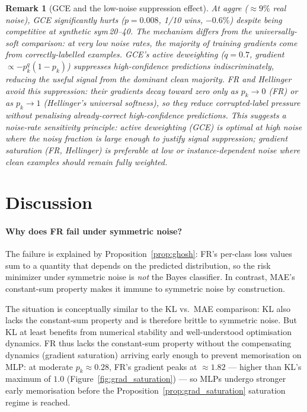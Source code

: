 \documentclass[11pt]{article}
\newtheorem{remark}{Remark}
\begin{document}
\begin{remark}[GCE and the low-noise suppression effect]
At aggre ($\approx 9\%$ real noise), GCE \emph{significantly hurts} ($p=0.008$, 1/10 wins, $-0.6\%$)
despite being competitive at synthetic sym\,20--40.
The mechanism differs from the universally-soft comparison: at very low noise rates,
the majority of training gradients come from correctly-labelled examples.
GCE's active deweighting ($q=0.7$, gradient $\propto -p_k^q(1-p_k)$)
suppresses high-confidence predictions indiscriminately, reducing the useful signal
from the dominant clean majority.
FR and Hellinger avoid this suppression: their gradients decay toward zero only as
$p_k\to 0$ (FR) or as $p_k\to 1$ (Hellinger's universal softness), so they
reduce corrupted-label pressure without penalising already-correct high-confidence predictions.
This suggests a \emph{noise-rate sensitivity} principle: active deweighting (GCE)
is optimal at high noise where the noisy fraction is large enough to justify
signal suppression; gradient saturation (FR, Hellinger) is preferable at low or
instance-dependent noise where clean examples should remain fully weighted.
\end{remark}

\section{Discussion}
\label{sec:discussion}

\paragraph{Why does FR fail under symmetric noise?}
The failure is explained by Proposition~\ref{prop:ghosh}: FR's per-class loss
values sum to a quantity that depends on the predicted distribution, so the
risk minimizer under symmetric noise is \emph{not} the Bayes classifier.
In contrast, MAE's constant-sum property makes it immune to symmetric noise by
construction.

The situation is conceptually similar to the KL vs.\ MAE comparison: KL also
lacks the constant-sum property and is therefore brittle to symmetric noise.
But KL at least benefits from numerical stability and well-understood
optimisation dynamics.
FR thus lacks the constant-sum property without the compensating dynamics
(gradient saturation) arriving early enough to prevent memorisation on MLP:
at moderate $p_k \approx 0.28$, FR's gradient peaks at $\approx 1.82$ — higher
than KL's maximum of $1.0$ (Figure~\ref{fig:grad_saturation}) — so MLPs
undergo stronger early memorisation before the Proposition~\ref{prop:grad_saturation}
saturation regime is reached.
\end{document}
